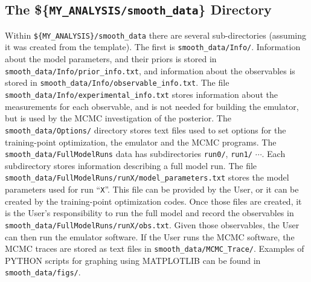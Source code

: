 \documentclass[UserManual.tex]{subfiles}
\begin{document}
\subsection{The \$\{{\tt MY\_ANALYSIS/smooth\_data}\} Directory}

Within {\tt \$\{MY\_ANALYSIS\}/smooth\_data} there are several sub-directories (assuming it was created from the template). The first is {\tt smooth\_data/Info/}. Information about the model parameters, and their priors is stored in {\tt smooth\_data/Info/prior\_info.txt}, and information about the observables is stored in {\tt smooth\_data/Info/observable\_info.txt}. The file {\tt smooth\_data/Info/experimental\_info.txt} stores information about the measurements for each observable, and is not needed for building the emulator, but is used by the MCMC investigation of the posterior. The {\tt smooth\_data/Options/} directory stores text files used to set options for the training-point optimization, the emulator and the MCMC programs. The {\tt smooth\_data/FullModelRuns} data has subdirectories {\tt run0/}, {\tt run1/} $\cdots$. Each subdirectory stores information describing a full model run. The file {\tt smooth\_data/FullModelRuns/runX/model\_parameters.txt} stores the model parameters used for run ``{\tt X}''. This file can be provided by the User, or it can be created by the training-point optimization codes. Once those files are created, it is the User's responsibility to run the full model and record the observables in {\tt smooth\_data/FullModelRuns/runX/obs.txt}. Given those observables, the User can then run the emulator software. If the User runs the MCMC software, the MCMC traces are stored as text files in {\tt smooth\_data/MCMC\_Trace/}. Examples of PYTHON scripts for graphing using MATPLOTLIB can be found in {\tt smooth\_data/figs/}.
\end{document}
